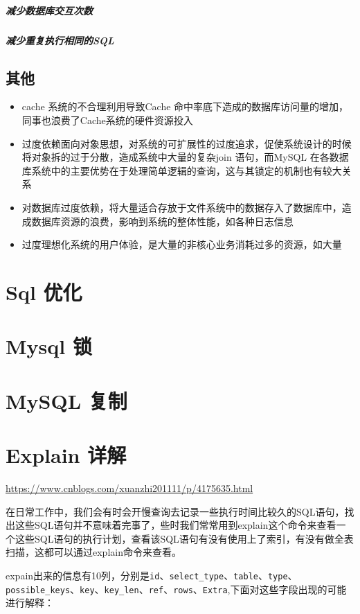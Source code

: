 \documentclass[UTF8,a4paper,12pt]{ctexbook}
\begin{document}
		\subparagraph{减少数据库交互次数}
		\subparagraph{减少重复执行相同的SQL}
	
		\subsection{其他}
			\begin{itemize}
				\item cache 系统的不合理利用导致Cache 命中率底下造成的数据库访问量的增加，同事也浪费了Cache系统的硬件资源投入
				\item 过度依赖面向对象思想，对系统的可扩展性的过度追求，促使系统设计的时候将对象拆的过于分散，造成系统中大量的复杂join 语句，而MySQL 在各数据库系统中的主要优势在于处理简单逻辑的查询，这与其锁定的机制也有较大关系
				\item 对数据库过度依赖，将大量适合存放于文件系统中的数据存入了数据库中，造成数据库资源的浪费，影响到系统的整体性能，如各种日志信息
				\item 过度理想化系统的用户体验，是大量的非核心业务消耗过多的资源，如大量
			\end{itemize}
			
	\section{Sql 优化}	
	
	\section{Mysql 锁}
		
	\section{MySQL 复制}

	\section{Explain 详解}
		\url{https://www.cnblogs.com/xuanzhi201111/p/4175635.html}
		
		在日常工作中，我们会有时会开慢查询去记录一些执行时间比较久的SQL语句，找出这些SQL语句并不意味着完事了，些时我们常常用到explain这个命令来查看一个这些SQL语句的执行计划，查看该SQL语句有没有使用上了索引，有没有做全表扫描，这都可以通过explain命令来查看。
		
		expain出来的信息有10列，分别是\verb|id|、\verb|select_type|、\verb|table|、\verb|type|、\verb|possible_keys|、\verb|key|、\verb|key_len|、\verb|ref|、\verb|rows|、\verb|Extra|,下面对这些字段出现的可能进行解释：
		
\end{document}
